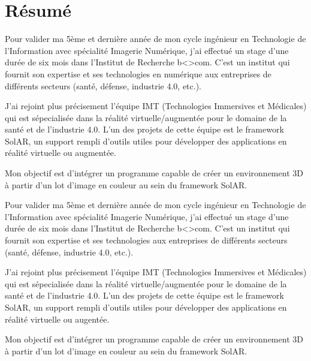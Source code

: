 \chapter*{Résumé}

\par
Pour valider ma 5ème et dernière année de mon cycle ingénieur en Technologie de l’Information avec spécialité Imagerie Numérique, j’ai effectué un stage d’une durée de six mois dans l’Institut de Recherche b<>com. C'est un institut qui fournit son expertise et ses technologies en numérique aux entreprises de différents secteurs (santé, défense, industrie 4.0, etc.).

\par
J'ai rejoint plus précisement l'équipe IMT (Technologies Immersives et Médicales) qui est sépecialisée dans la réalité virtuelle/augmentée pour le domaine de la santé et de l'industrie 4.0. L'un des projets de cette équipe est le framework SolAR, un support rempli d'outils utiles pour développer des applications en réalité virtuelle ou augmentée.

\par
Mon objectif est d'intégrer un programme capable de créer un environnement 3D à partir d'un lot d'image en couleur au sein du framework SolAR.

\vspace{40pt}

\color{gray}

\par
Pour valider ma 5ème et dernière année de mon cycle ingénieur en Technologie de l’Information avec spécialité Imagerie Numérique, j’ai effectué un stage d’une durée de six mois dans l’Institut de Recherche b<>com. C'est un institut qui fournit son expertise et ses technologies aux entreprises de différents secteurs (santé, défense, industrie 4.0, etc.).

\par
J'ai rejoint plus précisement l'équipe IMT (Technologies Immersives et Médicales) qui est sépecialisée dans la réalité virtuelle/augmentée pour le domaine de la santé et de l'industrie 4.0. L'un des projets de cette équipe est le framework SolAR, un support rempli d'outils utiles pour développer des applications en réalité virtuelle ou augentée.

\par
Mon objectif est d'intégrer un programme capable de créer un environnement 3D à partir d'un lot d'image en couleur au sein du framework SolAR.

\color{black}